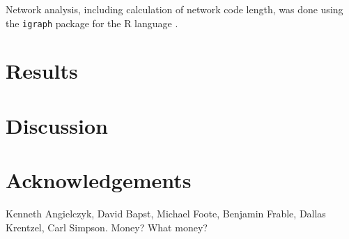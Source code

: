 \documentclass[12pt,letterpaper]{article}
\begin{document}
Network analysis, including calculation of network code length, was done using the \texttt{igraph} package \citep{Csardi2006} for the R language \citep{R2013}.

%
%


\section{Results}


\section{Discussion}


\section*{Acknowledgements}
Kenneth Angielczyk, David Bapst, Michael Foote, Benjamin Frable, Dallas Krentzel, Carl Simpson. Money? What money?



\end{document}

